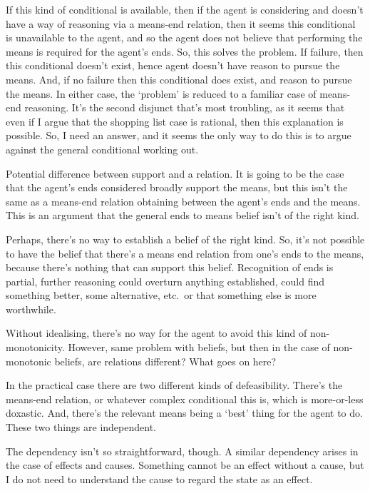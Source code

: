 \documentclass[10pt]{article}
\begin{document}
If this kind of conditional is available, then if the agent is considering and doesn't have a way of reasoning via a means-end relation, then it seems this conditional is unavailable to the agent, and so the agent does not believe that performing the means is required for the agent's ends.
So, this solves the problem.
If failure, then this conditional doesn't exist, hence agent doesn't have reason to pursue the means.
And, if no failure then this conditional does exist, and reason to pursue the means.
In either case, the `problem' is reduced to a familiar case of means-end reasoning.
It's the second disjunct that's most troubling, as it seems that even if I argue that the shopping list case is rational, then this explanation is possible.
So, I need an answer, and it seems the only way to do this is to argue against the general conditional working out.

Potential difference between support and a relation.
It is going to be the case that the agent's ends considered broadly support the means, but this isn't the same as a means-end relation obtaining between the agent's ends and the means.
This is an argument that the general ends to means belief isn't of the right kind.

Perhaps, there's no way to establish a belief of the right kind.
So, it's not possible to have the belief that there's a means end relation from one's ends to the means, because there's nothing that can support this belief.
Recognition of ends is partial, further reasoning could overturn anything established, could find something better, some alternative, etc.\ or that something else is more worthwhile.

Without idealising, there's no way for the agent to avoid this kind of non-monotonicity.
However, same problem with beliefs, but then in the case of non-monotonic beliefs, are relations different?
What goes on here?

In the practical case there are two different kinds of defeasibility.
There's the means-end relation, or whatever complex conditional this is, which is more-or-less doxastic.
And, there's the relevant means being a `best' thing for the agent to do.
These two things are independent.




The dependency isn't so straightforward, though.
A similar dependency arises in the case of effects and causes.
Something cannot be an effect without a cause, but I do not need to understand the cause to regard the state as an effect.
\end{document}
